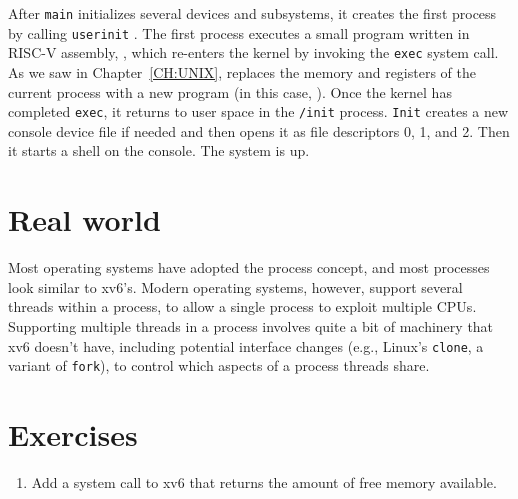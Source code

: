 After
\lstinline{main}
initializes several devices and subsystems, 
it creates the first process by calling 
\lstinline{userinit}
.
The first process executes a small program written in RISC-V assembly,
,
which re-enters the kernel by invoking the
\lstinline{exec}
system call.
As we saw in Chapter~\ref{CH:UNIX}, 
replaces the memory and registers of the
current process with a new program (in this case,
).
Once the kernel has completed 
\lstinline{exec},
it returns to user space in
the \lstinline{/init} process.
\lstinline{Init}
creates a new console device file
if needed
and then opens it as file descriptors 0, 1, and 2.
Then it starts a shell on the console.
The system is up.
\section{Real world}

Most operating systems have adopted the process concept, and most
processes look similar to xv6's.  Modern operating systems, however,
support several threads within a process, to allow a single process to
exploit multiple CPUs.  Supporting multiple threads in a
process involves quite a bit of machinery that xv6 doesn't have,
including potential interface changes (e.g., Linux's
\lstinline{clone},
a variant of
\lstinline{fork}),
to control which aspects of
a process threads share.
\section{Exercises}

\begin{enumerate}

\item Add a system call to xv6
  that returns the amount of free memory available.


\end{enumerate}
